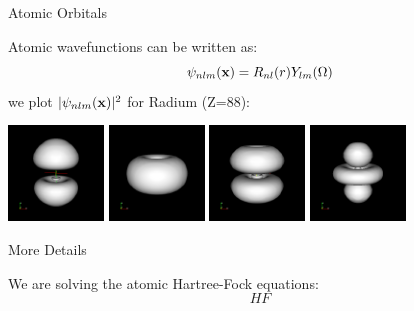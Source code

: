 \documentclass{beamer}
\begin{document}
\begin{frame}{Atomic Orbitals}

Atomic wavefunctions can be written as:
\[
    \psi_{nlm}({\bf x}) = R_{nl}(r) Y_{lm}(\Omega)
\]
we plot $| \psi_{nlm}({\bf x})|^2$ for Radium (Z=88):

\includegraphics[width=1in]{../img/orbital_n6l1m0.png}
\includegraphics[width=1in]{../img/orbital_n5l2m2.png}
\includegraphics[width=1in]{../img/orbital_n5l2m1.png}
\includegraphics[width=1in]{../img/orbital_n5l2m0.png}

\end{frame}

\begin{frame}{More Details}

We are solving the atomic Hartree-Fock equations:
\[
    HF
\]

\end{frame}
\end{document}
